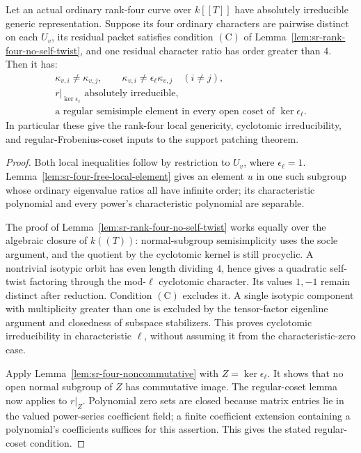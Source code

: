 \begin{srproposition}
\label{prop:sr-four-curve-genericity}
Let an actual ordinary rank-four curve over \(k[[T]]\) have
absolutely irreducible generic representation.
Suppose its four ordinary characters are pairwise distinct
on each \(U_v\), its residual packet satisfies condition
\(\mathrm{(C)}\) of Lemma~\ref{lem:sr-rank-four-no-self-twist},
and one residual character ratio has order greater than \(4\).
Then it has:
\[
 \begin{gathered}
 \kappa_{v,i}\ne\kappa_{v,j},\qquad
 \kappa_{v,i}\ne\epsilon_\ell\kappa_{v,j}\quad(i\ne j),\\
 r|_{\ker\epsilon_\ell}\text{ absolutely irreducible},\\
 \text{a regular semisimple element in every open coset of }
                         \ker\epsilon_\ell .
 \end{gathered}
\]
In particular these give the rank-four local genericity,
cyclotomic irreducibility, and regular-Frobenius-coset inputs
to the support patching theorem.
\end{srproposition}
\begin{proof}
Both local inequalities follow by restriction to \(U_v\),
where \(\epsilon_\ell=1\).
Lemma~\ref{lem:sr-four-free-local-element} gives an element
\(u\) in one such subgroup whose ordinary eigenvalue ratios
all have infinite order; its characteristic polynomial and
every power's characteristic polynomial are separable.

The proof of Lemma~\ref{lem:sr-rank-four-no-self-twist}
works equally over the algebraic closure of \(k((T))\):
normal-subgroup semisimplicity uses the socle argument, and
the quotient by the cyclotomic kernel is still procyclic.
A nontrivial isotypic orbit has even length dividing \(4\),
hence gives a quadratic self-twist factoring through the
mod-\(\ell\) cyclotomic character. Its values \(1,-1\)
remain distinct after reduction.
Condition \(\mathrm{(C)}\) excludes it.
A single isotypic component with multiplicity greater than
one is excluded by the tensor-factor eigenline argument
and closedness of subspace stabilizers.
This proves cyclotomic irreducibility in characteristic
\(\ell\), without assuming it from the characteristic-zero
case.

Apply Lemma~\ref{lem:sr-four-noncommutative} with
\(Z=\ker\epsilon_\ell\).
It shows that no open normal subgroup of \(Z\) has
commutative image.
The regular-coset lemma now applies to \(r|_Z\).
Polynomial zero sets are closed because matrix entries lie
in the valued power-series coefficient field; a finite
coefficient extension containing a polynomial's coefficients
suffices for this assertion.
This gives the stated regular-coset condition.
\end{proof}

